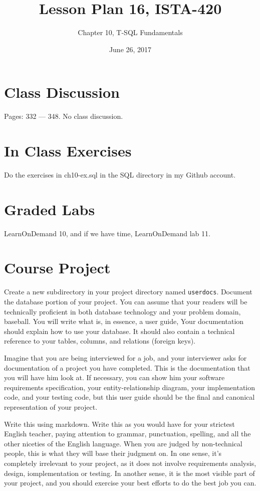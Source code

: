 \documentclass{article}
\title{Lesson Plan 16, ISTA-420}
\author{Chapter 10, T-SQL Fundamentals}
\date{June 26, 2017}
\begin{document}
    

    \maketitle{}

    \section{Class Discussion}

    Pages: 332 --- 348.  No class discussion.

    \section{In Class Exercises}

Do the exercises in ch10-ex.sql in the SQL directory in my Github account.

    \section{Graded Labs}

    LearnOnDemand 10, and if we have time, LearnOnDemand lab 11.

    \section{Course Project}

    Create a new subdirectory in your project directory named \texttt{userdocs}. Document the database portion of your project. You can assume that your readers will be technically proficient in both database technology and your problem domain, baseball.  You will write what is, in essence, a user guide, Your documentation should explain how to use your database. It should also contain a technical reference to your tables, columns, and relations (foreign keys).

    Imagine that you are being interviewed for a job, and your interviewer asks for documentation of a project you have completed. This is the documentation that you will have him look at. If necessary, you can show him your software requirements specification, your entity-relationship diagram, your implementation code, and your testing code, but this user guide should be the final and canonical representation of your project.

    Write this using markdown.  Write this as you would have for your strictest English teacher, paying attention to grammar, punctuation, spelling, and all the other niceties of the English language. When you are judged by non-technical people, this is what they will base their judgment on. In one sense, it's completely irrelevant to your project, as it does not involve requirements analysis, design, iomplementation or testing. In another sense, it is the most visible part of your project, and you should exercise your best efforts to do the best job you can.
\end{document}
